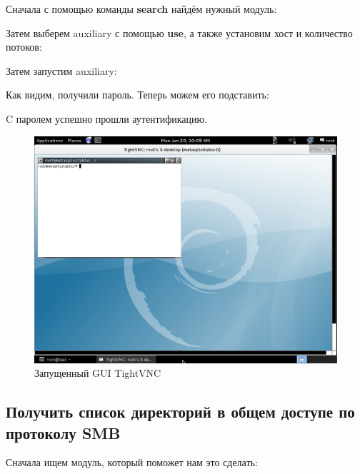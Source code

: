 \documentclass[a4paper]{article}
\begin{document}
Сначала с помощью команды \textbf{search} найдём нужный модуль:



Затем выберем auxiliary с помощью \textbf{use}, а также установим хост и количество потоков:



Затем запустим auxiliary:



Как видим, получили пароль. Теперь можем его подставить:



C паролем успешно прошли аутентификацию.

\begin{figure}[H]
	\begin{center}
		\includegraphics[scale=0.5]{pics/tightvnc.png}
		\caption{Запущенный GUI TightVNC} 
		\label{pic:pic_name}
	\end{center}
\end{figure}

\subsection{Получить список директорий в общем доступе по протоколу SMB}

Сначала ищем модуль, который поможет нам это сделать:
\end{document}
